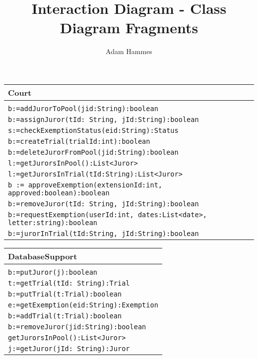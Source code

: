 \documentclass[12pt]{article}
\title{\vspace{1in}Interaction Diagram - Class Diagram Fragments}
\author{Adam Hammes}
\begin{document}
\maketitle

\begin{tabular}{| l |}
    \hline
    Court\\
    \hline\\
    \hline
    \texttt{b:=addJurorToPool(jid:String):boolean}\\
    \texttt{b:=assignJuror(tId: String, jId:String):boolean}\\
    \texttt{s:=checkExemptionStatus(eid:String):Status}\\
    \texttt{b:=createTrial(trialId:int):boolean}\\
    \texttt{b:=deleteJurorFromPool(jid:String):boolean}\\
    \texttt{l:=getJurorsInPool():List<Juror>}\\
    \texttt{l:=getJurorsInTrial(tId:String):List<Juror>}\\
    \texttt{b := approveExemption(extensionId:int, approved:boolean):boolean}\\
    \texttt{b:=removeJuror(tId: String, jId:String):boolean}\\
    \texttt {b:=requestExemption(userId:int, dates:List<date>, letter:string):boolean}\\
    \texttt{b:=jurorInTrial(tId:String, jId:String):boolean}\\
    \hline
\end{tabular}

\vspace{1cm}

\begin{tabular}{| l |}
    \hline
    DatabaseSupport\\
    \hline\\
    \hline
    \texttt{b:=putJuror(j):boolean}\\
    \texttt{t:=getTrial(tId: String):Trial}\\
    \texttt{b:=putTrial(t:Trial):boolean}\\
    \texttt{e:=getExemption(eid:String):Exemption}\\
    \texttt{b:=addTrial(t:Trial):boolean}\\
    \texttt{b:=removeJuror(jid:String):boolean}\\
    \texttt{getJurorsInPool():List<Juror>}\\
    \texttt{j:=getJuror(jId: String):Juror}\\
    \hline
\end{tabular}
\end{document}
